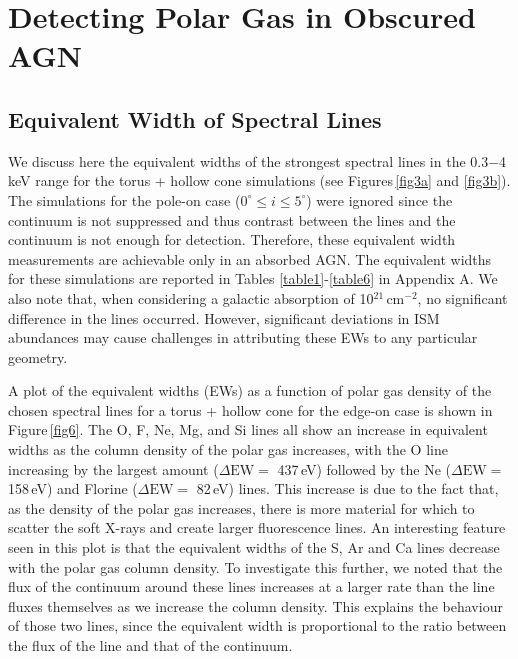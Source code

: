 \documentclass[fleqn,usenatbib]{mnras}
\begin{document}
    \section{Detecting Polar Gas in Obscured AGN}
        
        \subsection{Equivalent Width of Spectral Lines}
    
            We discuss here the equivalent widths of the strongest spectral lines in the 0.3$-$4\,keV range for the torus + hollow cone simulations (see Figures\,\ref{fig3a} and \ref{fig3b}). The simulations for the pole-on case ($0^{\circ} \leq i \leq 5^{\circ}$) were ignored since the continuum is not suppressed and thus contrast between the lines and the continuum is not enough for detection. Therefore, these equivalent width measurements are achievable only in an absorbed AGN. The equivalent widths for these simulations are reported in Tables \ref{table1}-\ref{table6} in Appendix A. We also note that, when considering a galactic absorption of 10$^{21}$\,cm$^{-2}$, no significant difference in the lines occurred. However, significant deviations in ISM abundances may cause challenges in attributing these EWs to any particular geometry.     
        
            A plot of the equivalent widths (EWs) as a function of polar gas density of the chosen spectral lines for a torus + hollow cone for the edge-on case is shown in Figure\,\ref{fig6}. The O, F, Ne, Mg, and Si lines all show an increase in equivalent widths as the column density of the polar gas increases, with the O line increasing by the largest amount ($\Delta\text{EW}=$ 437\,eV) followed by the Ne ($\Delta\text{EW}=$ 158\,eV) and Florine ($\Delta\text{EW}=$ 82\,eV) lines. This increase is due to the fact that, as the density of the polar gas increases, there is more material for which to scatter the soft X-rays and create larger fluorescence lines. An interesting feature seen in this plot is that the equivalent widths of the S, Ar and Ca lines decrease with the polar gas column density. To investigate this further, we noted that the flux of the continuum around these lines increases at a larger rate than the line fluxes themselves as we increase the column density. This explains the behaviour of those two lines, since the equivalent width is proportional to the ratio between the flux of the line and that of the continuum.   
\end{document}
